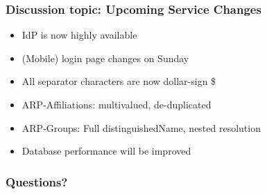 \begin{frame}
\frametitle{Discussion topic: Upcoming Service Changes}
\begin{itemize}
\item IdP is now highly available 
\item (Mobile) login page changes on Sunday 
\item All separator characters are now dollar-sign \$ 
\item ARP-Affiliations: multivalued, de-duplicated 
\item ARP-Groups: Full distinguishedName, nested resolution
\item Database performance will be improved
\end{itemize}
\end{frame}

\begin{frame}
\frametitle{Questions?}
\end{frame}


